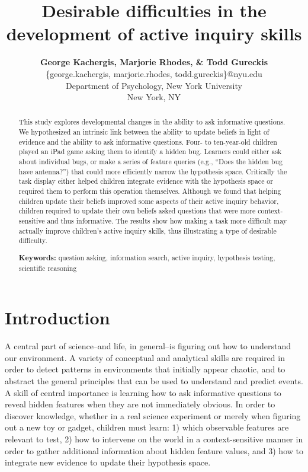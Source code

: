 \documentclass[man,floatsintext]{apa6}
\title{Desirable difficulties in the development of active inquiry skills}
\author{
  {\large \bf George Kachergis, Marjorie Rhodes, \& Todd Gureckis} \\
  \{george.kachergis, marjorie.rhodes, todd.gureckis\}@nyu.edu \\
  Department of Psychology, New York University \\
  New York, NY
}
\begin{document}
\maketitle

\begin{abstract}
This study explores developmental changes in the ability to ask 
informative questions.  We hypothesized an intrinsic link between the ability to 
update beliefs in light of evidence and the ability to ask informative questions. 
Four- to ten-year-old children 
played an iPad game asking them to identify a hidden bug. Learners could either 
ask about individual bugs, or make a series of feature queries (e.g., ``Does the 
hidden bug have antenna?'') that could more efficiently narrow the hypothesis 
space. Critically the task display either helped children integrate evidence 
with the hypothesis space or required them to perform this operation themselves.  Although we 
found that helping children update their beliefs improved some aspects of their active 
inquiry behavior, children required to update their own beliefs asked questions that 
were more context-sensitive and thus informative.  The results show how making a 
task more difficult may actually improve children's active inquiry skills, thus 
illustrating a type of desirable difficulty.

\textbf{Keywords:} 
question asking, information search, active inquiry, hypothesis testing, scientific 
reasoning
\end{abstract}


\section{Introduction} 


A central part of science--and life, in general--is figuring out how to understand our environment. 
A variety of conceptual and analytical skills are required in order to detect patterns in 
environments that initially appear chaotic, and to abstract the general principles that can 
be used to understand and predict events. A skill of central importance is learning how to ask 
informative questions to reveal hidden features when they are not 
immediately obvious. In order to discover knowledge, whether in a real science experiment or 
merely when figuring out a new toy or gadget, children must learn: 1) which 
observable features are relevant to test, 2) how to intervene on the world in a 
context-sensitive manner in order to gather additional information about hidden 
feature values, and 3) how to integrate new evidence to update their hypothesis space.
\end{document}

